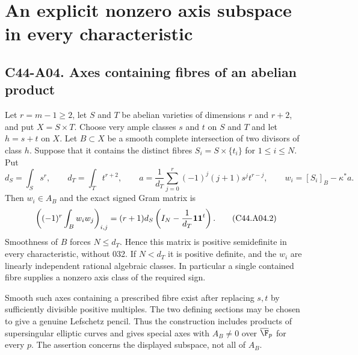 \section{An explicit nonzero axis subspace in every characteristic}

\subsection*{C44-A04. Axes containing fibres of an abelian product}
\begin{theorem}[C44-A04]\label{thm:product-axis}
Let $r=m-1\ge2$, let $S$ and $T$ be abelian varieties of dimensions
$r$ and $r+2$, and put $X=S\times T$. Choose very ample classes
$s$ and $t$ on $S$ and $T$ and let $h=s+t$ on $X$. Let
$B\subset X$ be a smooth complete intersection of two divisors of
class $h$. Suppose that it contains the distinct fibres
$S_i=S\times\{t_i\}$ for $1\le i\le N$. Put
\[
 d_S=\int_Ss^r,\qquad d_T=\int_Tt^{r+2},\qquad
 a=\frac1{d_T}\sum_{j=0}^r(-1)^j(j+1)s^jt^{r-j},
 \qquad w_i=[S_i]_B-\kappa^*a.
 \tag{C44.A04.1}
\]
Then $w_i\in A_B$ and the exact signed Gram matrix is
\[
 \left((-1)^r\int_B w_iw_j\right)_{i,j}
       =(r+1)d_S\left(I_N-\frac1{d_T}{\bf1}{\bf1}^{t}\right).
 \tag{C44.A04.2}
\]
Smoothness of $B$ forces $N\le d_T$. Hence this matrix is positive
semidefinite in every characteristic, without 032. If $N<d_T$ it is
positive definite, and the $w_i$ are linearly independent rational
algebraic classes. In particular a single contained fibre supplies a
nonzero axis class of the required sign.

Smooth such axes containing a prescribed fibre exist after replacing
$s,t$ by sufficiently divisible positive multiples. The two defining
sections may be chosen to give a genuine Lefschetz pencil. Thus the
construction includes products of supersingular elliptic curves and
gives special axes with $A_B\ne0$ over $\overline{\F}_p$ for every $p$.
The assertion concerns the displayed subspace, not all of $A_B$.
\end{theorem}
